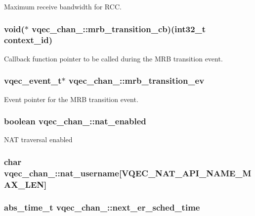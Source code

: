 Maximum receive bandwidth for RCC. 
\subsubsection{\setlength{\rightskip}{0pt plus 5cm}void($\ast$ \bf{vqec\_\-chan\_\-::mrb\_\-transition\_\-cb})(int32\_\-t \bf{context\_\-id})}\label{structvqec__chan___c6c270210df55fe993561cf4d0627855}


Callback function pointer to be called during the MRB transition event. 
\subsubsection{\setlength{\rightskip}{0pt plus 5cm}vqec\_\-event\_\-t$\ast$ \bf{vqec\_\-chan\_\-::mrb\_\-transition\_\-ev}}\label{structvqec__chan___b8f3694656cd8c3883a2810218f1013f}


Event pointer for the MRB transition event. 
\subsubsection{\setlength{\rightskip}{0pt plus 5cm}boolean \bf{vqec\_\-chan\_\-::nat\_\-enabled}}\label{structvqec__chan___914dd4a91cc443e140b73993d67dbb42}


NAT traversal enabled 
\subsubsection{\setlength{\rightskip}{0pt plus 5cm}char \bf{vqec\_\-chan\_\-::nat\_\-username}[VQEC\_\-NAT\_\-API\_\-NAME\_\-MAX\_\-LEN]}\label{structvqec__chan___ad2fc42f85122f037d5108be2f5de7d3}


\subsubsection{\setlength{\rightskip}{0pt plus 5cm}abs\_\-time\_\-t \bf{vqec\_\-chan\_\-::next\_\-er\_\-sched\_\-time}}\label{structvqec__chan___68d61b6251affca31e1d37cfca5eb802}


